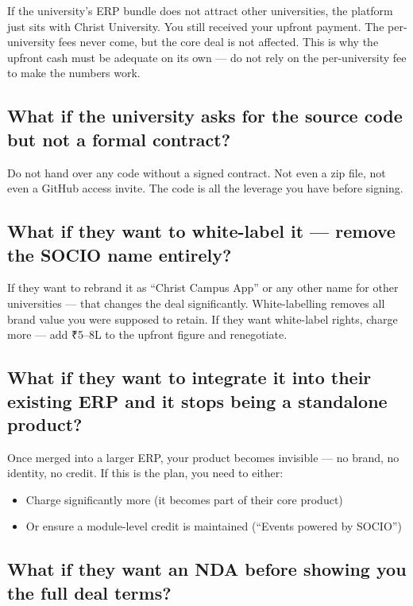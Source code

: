 \documentclass[12pt,a4paper]{article}
\begin{document}
    If the university's ERP bundle does not attract other universities, the platform just sits with Christ University. You still received your upfront payment. The per-university fees never come, but the core deal is not affected. This is why the upfront cash must be adequate on its own — do not rely on the per-university fee to make the numbers work.

    \subsection{What if the university asks for the source code but not a formal contract?}

    Do not hand over any code without a signed contract. Not even a zip file, not even a GitHub access invite. The code is all the leverage you have before signing.

    \subsection{What if they want to white-label it — remove the SOCIO name entirely?}

    If they want to rebrand it as ``Christ Campus App'' or any other name for other universities — that changes the deal significantly. White-labelling removes all brand value you were supposed to retain. If they want white-label rights, charge more — add ₹5–8L to the upfront figure and renegotiate.

    \subsection{What if they want to integrate it into their existing ERP and it stops being a standalone product?}

    Once merged into a larger ERP, your product becomes invisible — no brand, no identity, no credit. If this is the plan, you need to either:
    \begin{itemize}[leftmargin=*, noitemsep]
        \item Charge significantly more (it becomes part of their core product)
        \item Or ensure a module-level credit is maintained (``Events powered by SOCIO'')
    \end{itemize}

    \subsection{What if they want an NDA before showing you the full deal terms?}
\end{document}
